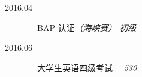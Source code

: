 \begin{tcolorbox}[colback=yellow!58!red,colframe=orange!75!black]
    \begin{description}
        \item [2016.04] ~~BAP 认证\emph{（海峡赛）} \emph{初级}
        \item [2016.06] ~~大学生英语四级考试 ~~\emph{530}
    \end{description}
\end{tcolorbox}